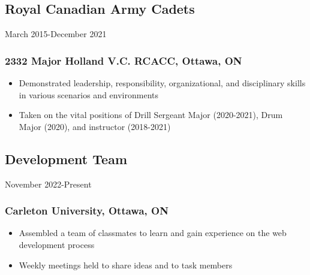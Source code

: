 \documentclass{article}
\newenvironment{itemlist}
{\begin{itemize}
	\setlength{\itemsep}{0em}
	\setlength{\parskip}{0em}
	\setlength{\parsep}{0em}
}
{\end{itemize}}
\begin{document}
\subsection{Royal Canadian Army Cadets}\hfill{March 2015-December 2021}
\subsubsection{2332 Major Holland V.C. RCACC, Ottawa, ON}
\begin{itemlist}
\item Demonstrated leadership, responsibility, organizational, and disciplinary skills in various scenarios and environments
\item Taken on the vital positions of Drill Sergeant Major (2020-2021), Drum Major (2020), and instructor (2018-2021)
\end{itemlist}

\subsection{Development Team}\hfill{November 2022-Present}
\subsubsection{Carleton University, Ottawa, ON}
\begin{itemlist}
\item Assembled a team of classmates to learn and gain experience on the web development process
\item Weekly meetings held to share ideas and to task members
\end{itemlist}
\end{document}
